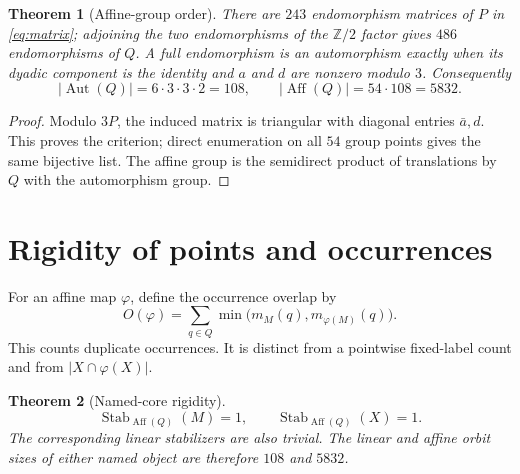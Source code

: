 \documentclass[10pt]{article}
\newtheorem{theorem}{Theorem}
\newcommand{\Z}{\mathbb Z}
\begin{document}
\begin{theorem}[Affine-group order]\label{thm:order}
There are $243$ endomorphism matrices of $P$ in \eqref{eq:matrix}; adjoining
the two endomorphisms of the $\Z/2$ factor gives $486$ endomorphisms of $Q$.
A full endomorphism is an automorphism exactly when its dyadic component is
the identity and $a$ and $d$ are nonzero modulo $3$.  Consequently
\[
 |\operatorname{Aut}(Q)|=6\cdot3\cdot3\cdot2=108,
 \qquad |\operatorname{Aff}(Q)|=54\cdot108=5832.
\]
\end{theorem}

\begin{proof}
Modulo $3P$, the induced matrix is triangular with diagonal entries
$\bar a,d$.  This proves the criterion; direct enumeration on all $54$ group
points gives the same bijective list.  The affine group is the semidirect
product of translations by $Q$ with the automorphism group.
\end{proof}

\section{Rigidity of points and occurrences}
For an affine map $\varphi$, define the occurrence overlap by
\begin{equation}\label{eq:overlap}
 O(\varphi)=\sum_{q\in Q}\min\bigl(m_M(q),m_{\varphi(M)}(q)\bigr).
\end{equation}
This counts duplicate occurrences.  It is distinct from a pointwise
fixed-label count and from $|X\cap\varphi(X)|$.

\begin{theorem}[Named-core rigidity]\label{thm:rigidity}
\[
 \operatorname{Stab}_{\operatorname{Aff}(Q)}(M)=1,
 \qquad
 \operatorname{Stab}_{\operatorname{Aff}(Q)}(X)=1.
\]
The corresponding linear stabilizers are also trivial.  The linear and affine
orbit sizes of either named object are therefore $108$ and $5832$.
\end{theorem}
\end{document}
